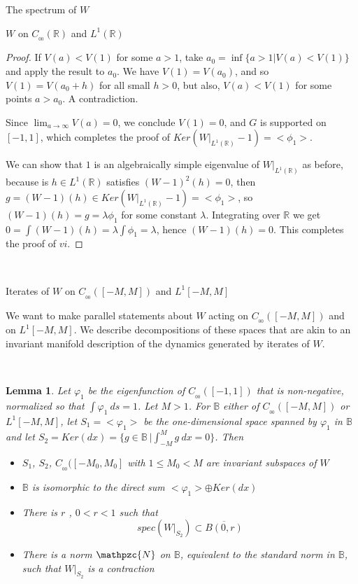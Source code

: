 \documentclass[12pt]{article}
\newtheorem{lemma}[theorem]{Lemma}
\begin{document}
\begin{section}{The spectrum of $W$ }
\begin{subsection}{$W$ on $C_{_{0\!0}}(\mathbb{R})$ and $L^1(\mathbb{R})$}
\begin{proof}
If $V(a) < V(1)$ for some $a>1$, take $a_0 = \inf \{a > 1| V(a) < V(1)\} $ and apply the result to $a_0$. We have $V(1) = V(a_0) $, and so $V(1)= V(a_0 + h)$ for all small $h > 0$, but also, $V(a) < V(1)$ for some points $a > a_0$. A contradiction.

Since $\lim_{a \rightarrow \infty } V(a) = 0$, we conclude $V(1)=0$, and $G$ is supported on $[-1,1]$, which completes the proof of $ Ker\left( W\Big|_{L^1(\mathbb{R})} - 1 \right) = <\phi_1>$.  

We can show that $1$ is an algebraically simple eigenvalue of $W\Big|_{L^1(\mathbb{R})}$ as before, because is $h \in L^1(\mathbb{R})$ satisfies $ (W -1)^2(h) = 0$, then $g = (W-1)(h) \in Ker\left( W\Big|_{L^1(\mathbb{R})} - 1 \right) = <\phi_1>$, so $(W-1)(h) = g = \lambda \phi_1$ for some constant $\lambda$. Integrating over $\mathbb{R}$ we get $0 = \int (W-1)(h) =  \lambda \int \phi_1 = \lambda $, hence $(W-1)(h) = 0$. This completes the proof of $vi$.
\end{proof}

\end{subsection}

\  
\  


\begin{subsection}{Iterates of $W$ on $C_{_{0\!0}}([-M,M])$ and $L^1[-M,M]$ }  \label{W_on_cpct}

\hspace{20pt}We want to make parallel statements about $W$ acting on $C_{_{0\!0}}([-M,M])$ and on $L^1[-M,M]$. We describe decompositions of these spaces that are akin to an invariant manifold description of the dynamics generated by iterates of $W$. 
 
\


\begin{lemma} \label{lmm:iters}
Let $\varphi_1$ be the eigenfunction of $C_{_{0\!0}}([-1,1])$ that is non-negative, normalized so that $\int \varphi_1 \ ds =1$. Let $M>1$. For $\mathbb{B}$ either of $C_{_{0\!0}}([-M,M])$ or $L^1[-M,M]$, let $S_1 = <\varphi_1>$ be the one-dimensional space spanned by $\varphi_1$ in $\mathbb{B}$ and let $S_2 = Ker( dx) = \{g \in \mathbb{B} \ | \int_{-M}^{M} g \  dx = 0 \} $. Then
\begin{itemize}
	\item[i.] $S_1$, $S_2$, $C_{_{00}}([-M_0,M_0]$ with $1 \le M_0 < M$ are invariant subspaces of $W$
	\item[ii.] $\mathbb{B}$ is isomorphic to the direct sum $<\varphi_1> \oplus Ker( dx)$
	\item[iii.] There is $r$ , $ 0 < r < 1$ such that 
	$$
	spec(W\Big|_{S_2}) \subset \overline{B(0,r)}
	$$
	\item[iv.] There is a norm $\mathpzc{N}$ on $\mathbb{B}$, equivalent to the standard norm in $\mathbb{B}$, such that $W\Big|_{S_2}$ is a contraction 
\end{itemize}
\end{lemma}



\end{subsection}
\end{section}
\end{document}
